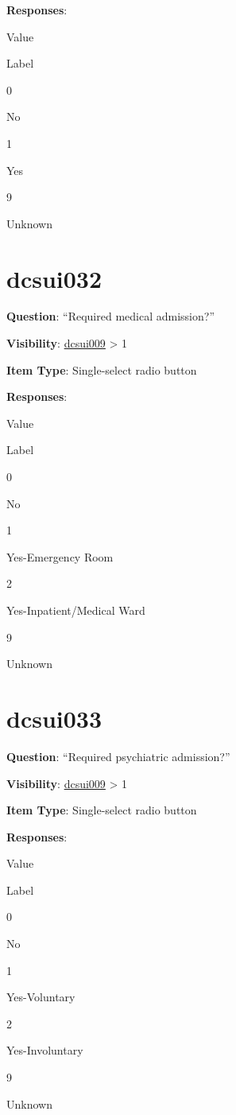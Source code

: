 \documentclass[]{book}
\begin{document}
\textbf{Responses}:

Value

Label

0

No

1

Yes

9

Unknown

\hypertarget{dcsui032}{%
\section{dcsui032}\label{dcsui032}}

\textbf{Question}: ``Required medical admission?''

\textbf{Visibility}: \protect\hyperlink{dcsui009}{dcsui009} \textgreater{} 1

\textbf{Item Type}: Single-select radio button

\textbf{Responses}:

Value

Label

0

No

1

Yes-Emergency Room

2

Yes-Inpatient/Medical Ward

9

Unknown

\hypertarget{dcsui033}{%
\section{dcsui033}\label{dcsui033}}

\textbf{Question}: ``Required psychiatric admission?''

\textbf{Visibility}: \protect\hyperlink{dcsui009}{dcsui009} \textgreater{} 1

\textbf{Item Type}: Single-select radio button

\textbf{Responses}:

Value

Label

0

No

1

Yes-Voluntary

2

Yes-Involuntary

9

Unknown
\end{document}
